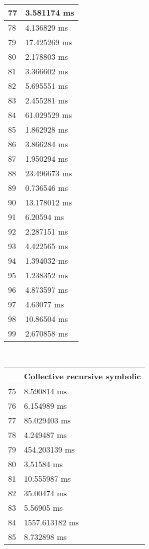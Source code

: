 \begin{multicols}{2}
\begin{tabular}{|l|l|}
		77 & 3.581174 ms \\ \hline
		78 & 4.136829 ms \\ \hline
		79 & 17.425269 ms \\ \hline
		80 & 2.178803 ms \\ \hline
		81 & 3.366602 ms \\ \hline
		82 & 5.695551 ms \\ \hline
		83 & 2.455281 ms \\ \hline
		84 & 61.029529 ms \\ \hline
		85 & 1.862928 ms \\ \hline
		86 & 3.866284 ms \\ \hline
		87 & 1.950294 ms \\ \hline
		88 & 23.496673 ms \\ \hline
		89 & 0.736546 ms \\ \hline
		90 & 13.178012 ms \\ \hline
		91 & 6.20594 ms \\ \hline
		92 & 2.287151 ms \\ \hline
		93 & 4.422565 ms \\ \hline
		94 & 1.394032 ms \\ \hline
		95 & 1.238352 ms \\ \hline
		96 & 4.873597 ms \\ \hline
		97 & 4.63077 ms \\ \hline
		98 & 10.86504 ms \\ \hline
		99 & 2.670858 ms \\ \hline
	\end{tabular}\\
	\begin{tabular}{|l|l|}
		\hline
		& Collective recursive symbolic \\ \hline
		75 & 8.590814 ms \\ \hline
		76 & 6.154989 ms \\ \hline
		77 & 85.029403 ms \\ \hline
		78 & 4.249487 ms \\ \hline
		79 & 454.203139 ms \\ \hline
		80 & 3.51584 ms \\ \hline
		81 & 10.555987 ms \\ \hline
		82 & 35.00474 ms \\ \hline
		83 & 5.56905 ms \\ \hline
		84 & 1557.613182 ms \\ \hline
		85 & 8.732898 ms \\ \hline

\end{tabular}
\end{multicols}
